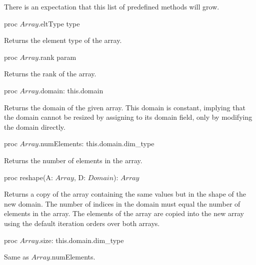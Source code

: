 There is an expectation that this list of predefined methods will grow.

\begin{protohead}
proc $Array$.eltType type
\end{protohead}
\begin{protobody}
Returns the element type of the array.
\end{protobody}

\begin{protohead}
proc $Array$.rank param
\end{protohead}
\begin{protobody}
Returns the rank of the array.
\end{protobody}

\begin{protohead}
proc $Array$.domain: this.domain
\end{protohead}
\begin{protobody}
Returns the domain of the given array.  This domain is constant,
implying that the domain cannot be resized by assigning to its domain
field, only by modifying the domain directly.
\end{protobody}

\begin{protohead}
proc $Array$.numElements: this.domain.dim_type
\end{protohead}
\begin{protobody}
Returns the number of elements in the array.
\end{protobody}

\begin{protohead}
proc reshape(A: $Array$, D: $Domain$): $Array$
\end{protohead}
\begin{protobody}
Returns a copy of the array containing the same values but in the
shape of the new domain.  The number of indices in the domain must
equal the number of elements in the array.  The elements of the array
are copied into the new array using the default iteration orders over
both arrays.
\end{protobody}

\begin{protohead}
proc $Array$.size: this.domain.dim_type
\end{protohead}
\begin{protobody}
Same as $Array$.numElements.
\end{protobody}
